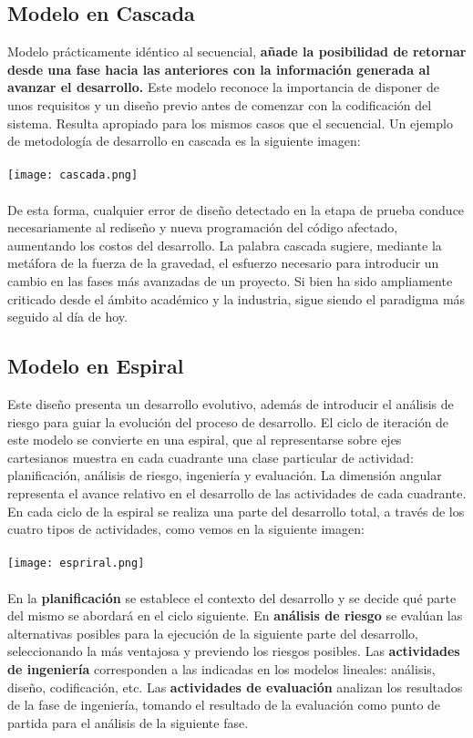 \documentclass{article}
\begin{document}
\newpage
\subsection{Modelo en Cascada}
Modelo prácticamente idéntico al secuencial, \textbf{añade la posibilidad de retornar desde una fase hacia las anteriores con la información generada al avanzar el desarrollo.} 
Este modelo reconoce la importancia de disponer de unos requisitos y un diseño previo antes de comenzar con la codificación del sistema. Resulta apropiado para los mismos 
casos que el secuencial. Un ejemplo de metodología de desarrollo en cascada es la siguiente imagen:
\\
\\
\texttt{[image: cascada.png]}
\\
\\
De esta forma, cualquier error de diseño detectado en la etapa de prueba conduce necesariamente al rediseño y nueva programación del código afectado, aumentando los costos del desarrollo. 
La palabra cascada sugiere, mediante la metáfora de la fuerza de la gravedad, el esfuerzo necesario para introducir un cambio en las fases más avanzadas de un proyecto. 
Si bien ha sido ampliamente criticado desde el ámbito académico y la industria, sigue siendo el paradigma más seguido al día de hoy.

\newpage
\subsection{Modelo en Espiral}
Este diseño presenta un desarrollo evolutivo, además de introducir el análisis de riesgo para guiar la evolución del proceso de desarrollo.
El ciclo de iteración de este modelo se convierte en una espiral, que al representarse sobre ejes cartesianos muestra en cada cuadrante una 
clase particular de actividad: planificación, análisis de riesgo, ingeniería y evaluación. La dimensión angular representa el avance relativo 
en el desarrollo de las actividades de cada cuadrante. En cada ciclo de la espiral se realiza una parte del desarrollo total, a través de los 
cuatro tipos de actividades, como vemos en la siguiente imagen:
\\
\\
\texttt{[image: espriral.png]}
\\
\\
En la \textbf{planificación} se establece el contexto del desarrollo y se decide qué parte del mismo se abordará en el ciclo siguiente.
En \textbf{análisis de riesgo} se evalúan las alternativas posibles para la ejecución de la siguiente parte del desarrollo, seleccionando la más ventajosa y previendo los riesgos posibles.
Las \textbf{actividades de ingeniería} corresponden a las indicadas en los modelos lineales: análisis, diseño, codificación, etc.
Las \textbf{actividades de evaluación} analizan los resultados de la fase de ingeniería, tomando el resultado de la evaluación como punto de partida para el análisis de la siguiente fase.
\end{document}
